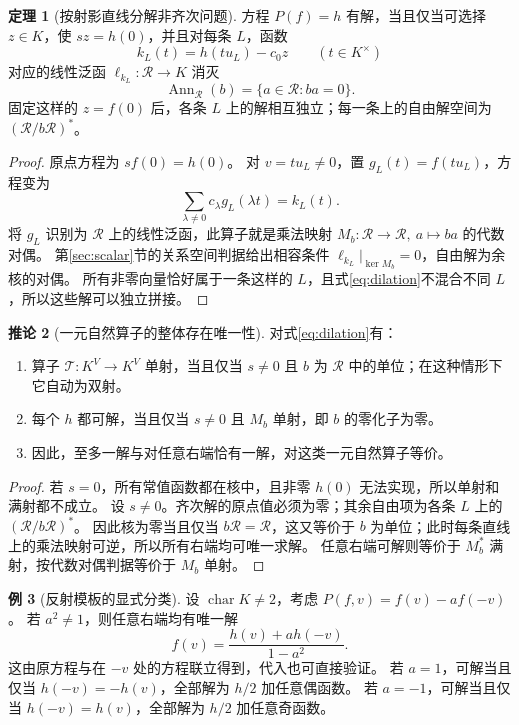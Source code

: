 \documentclass[UTF8,11pt,a4paper]{ctexart}
\theoremstyle{definition}
\newtheorem{theorem}{定理}[section]
\newtheorem{corollary}[theorem]{推论}
\newtheorem{example}[theorem]{例}
\newcommand{\T}{\mathcal T}
\begin{document}
\begin{theorem}[按射影直线分解非齐次问题]\label{thm:dilationsolve}
方程 $P(f)=h$ 有解，当且仅当可选择 $z\in K$，使 $sz=h(0)$，并且对每条 $L$，函数
\[
 k_L(t)=h(tu_L)-c_0z\qquad(t\in K^\times)
\]
对应的线性泛函 $\ell_{k_L}:\mathcal R\to K$ 消灭
\[
 \operatorname{Ann}_{\mathcal R}(b)=\{a\in\mathcal R:ba=0\}.
\]
固定这样的 $z=f(0)$ 后，各条 $L$ 上的解相互独立；每一条上的自由解空间为 $(\mathcal R/b\mathcal R)^*$。
\end{theorem}
\begin{proof}
原点方程为 $sf(0)=h(0)$。
对 $v=tu_L\ne0$，置 $g_L(t)=f(tu_L)$，方程变为
\[
 \sum_{\lambda\ne0}c_\lambda g_L(\lambda t)=k_L(t).
\]
将 $g_L$ 识别为 $\mathcal R$ 上的线性泛函，此算子就是乘法映射
$M_b:\mathcal R\to\mathcal R,\ a\mapsto ba$ 的代数对偶。
第\ref{sec:scalar}节的关系空间判据给出相容条件 $\ell_{k_L}|_{\ker M_b}=0$，自由解为余核的对偶。
所有非零向量恰好属于一条这样的 $L$，且式\eqref{eq:dilation}不混合不同 $L$，所以这些解可以独立拼接。
\end{proof}

\begin{corollary}[一元自然算子的整体存在唯一性]\label{cor:dilationbij}
对式\eqref{eq:dilation}有：
\begin{enumerate}
\item 算子 $\T:K^V\to K^V$ 单射，当且仅当 $s\ne0$ 且 $b$ 为 $\mathcal R$ 中的单位；在这种情形下它自动为双射。
\item 每个 $h$ 都可解，当且仅当 $s\ne0$ 且 $M_b$ 单射，即 $b$ 的零化子为零。
\item 因此，至多一解与对任意右端恰有一解，对这类一元自然算子等价。
\end{enumerate}
\end{corollary}
\begin{proof}
若 $s=0$，所有常值函数都在核中，且非零 $h(0)$ 无法实现，所以单射和满射都不成立。
设 $s\ne0$。齐次解的原点值必须为零；其余自由项为各条 $L$ 上的 $(\mathcal R/b\mathcal R)^*$。
因此核为零当且仅当 $b\mathcal R=\mathcal R$，这又等价于 $b$ 为单位；此时每条直线上的乘法映射可逆，所以所有右端均可唯一求解。
任意右端可解则等价于 $M_b^*$ 满射，按代数对偶判据等价于 $M_b$ 单射。
\end{proof}

\begin{example}[反射模板的显式分类]
设 $\operatorname{char}K\ne2$，考虑 $P(f,v)=f(v)-a f(-v)$。
若 $a^2\ne1$，则任意右端均有唯一解
\[
 f(v)=\frac{h(v)+a h(-v)}{1-a^2}.
\]
这由原方程与在 $-v$ 处的方程联立得到，代入也可直接验证。
若 $a=1$，可解当且仅当 $h(-v)=-h(v)$，全部解为 $h/2$ 加任意偶函数。
若 $a=-1$，可解当且仅当 $h(-v)=h(v)$，全部解为 $h/2$ 加任意奇函数。
\end{example}
\end{document}
